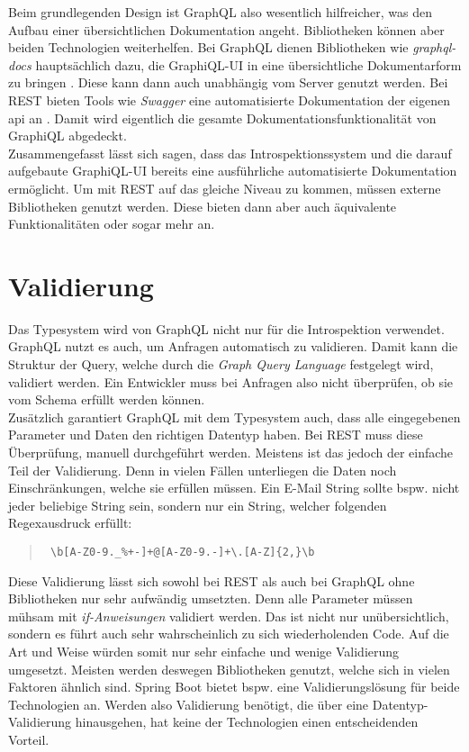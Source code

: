 Beim grundlegenden Design ist GraphQL also wesentlich hilfreicher, was den Aufbau einer übersichtlichen Dokumentation angeht. Bibliotheken können aber beiden Technologien weiterhelfen. Bei GraphQL dienen Bibliotheken wie \textit{graphql-docs}  hauptsächlich dazu, die GraphiQL-\ac{UI} in eine übersichtliche Dokumentarform zu bringen \parencite{graphqlDocs2016}. Diese kann dann auch unabhängig vom Server genutzt werden. Bei \ac{REST} bieten Tools wie \textit{Swagger} eine automatisierte Dokumentation der eigenen \ac{api} an \parencite{Swagger2020}. Damit wird eigentlich die gesamte Dokumentationsfunktionalität von GraphiQL abgedeckt.\\
Zusammengefasst lässt sich sagen, dass das Introspektionssystem und die darauf aufgebaute GraphiQL-\ac{UI} bereits eine ausführliche automatisierte Dokumentation ermöglicht. Um mit \ac{REST} auf das gleiche Niveau zu kommen, müssen externe Bibliotheken genutzt werden. Diese bieten dann aber auch äquivalente Funktionalitäten oder sogar mehr an.

\section{Validierung}\label{validierung}

Das Typesystem wird von GraphQL nicht nur für die Introspektion verwendet. GraphQL nutzt es auch, um Anfragen automatisch zu validieren. Damit kann die Struktur der Query, welche durch die \textit{Graph Query Language} festgelegt wird, validiert werden. Ein Entwickler muss bei Anfragen also nicht überprüfen, ob sie vom Schema erfüllt werden können.\\
Zusätzlich garantiert GraphQL mit dem Typesystem auch, dass alle eingegebenen Parameter und Daten den richtigen Datentyp haben. Bei \ac{REST} muss diese Überprüfung, manuell durchgeführt werden. Meistens ist das jedoch der einfache Teil der Validierung. Denn in vielen Fällen unterliegen die Daten noch Einschränkungen, welche sie erfüllen müssen. Ein E-Mail String sollte bspw. nicht jeder beliebige String sein, sondern nur ein String, welcher folgenden Regexausdruck erfüllt: 

\begin{quote}
\verb; \b[A-Z0-9._%+-]+@[A-Z0-9.-]+\.[A-Z]{2,}\b;
\end{quote}

Diese Validierung lässt sich sowohl bei \ac{REST} als auch bei GraphQL ohne Bibliotheken nur sehr aufwändig umsetzten. Denn alle Parameter müssen mühsam mit \textit{if-Anweisun\-gen} validiert werden. Das ist nicht nur unübersichtlich, sondern es führt auch sehr wahrscheinlich zu sich wiederholenden Code. Auf die Art und Weise würden somit nur sehr einfache und wenige Validierung umgesetzt. Meisten werden deswegen Bibliotheken genutzt, welche sich in vielen Faktoren ähnlich sind. Spring Boot bietet bspw. eine Validierungslösung für beide Technologien an. Werden also Validierung benötigt, die über eine Datentyp-Validierung hinausgehen, hat keine der Technologien einen entscheidenden Vorteil.

